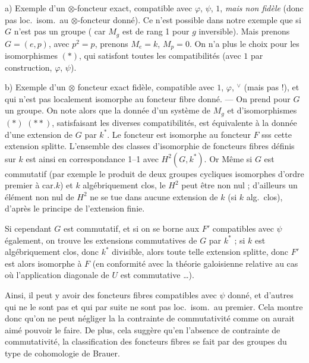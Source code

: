 \documentclass[11pt,a4paper]{article}
\begin{document}
a) Exemple d'un $\otimes$-foncteur exact, compatible avec $\varphi$, $\psi$,
$1$, \emph{mais non fidèle} (donc pas loc.\ isom.\ au $\otimes$-foncteur
donné). Ce n'est possible dans notre exemple que si $G$ n'est pas un groupe
( car $M_{g}$ est de rang 1 pour $g$ inversible). Mais prenons
$G = (e,p)$, avec $p^{2} = p$, prenons $M_{e} = k$, $M_{p} = 0$. On n'a plus le
choix pour les isomorphismes $(*)$, qui satisfont toutes les compatibilités
(avec $1$ par construction, $\varphi$, $\psi$).



b) Exemple d'un $\otimes$ foncteur exact fidèle, compatible avec
\struck{$\varphi$} $1$, $\varphi$, $^{\vee}$ (mais pas  !),
et qui n'est pas localement isomorphe au foncteur fibre donné. --- On prend pour
$G$ un groupe. On note alors que la donnée d'un système de $M_{g}$ et
d'isomorphismes $(*)$ \struck{\ill{}} $(**)$, satisfaisant les diverses
compatibilités, est équivalente à la donnée d'une extension de $G$ par $k^{*}$.
Le foncteur  est isomorphe au foncteur $F$ sss cette extension
splitte. L'ensemble des classes d'isomorphie de foncteurs fibres définis sur $k$
est ainsi en correspondance 1--1 avec $H^{2}(G,k^{*})$. Or Même si $G$ est
commutatif (par exemple le produit de deux groupes cycliques isomorphes d'ordre
premier à \struck{\ill{}} car.$k$) et $k$ algébriquement clos, le $H^{2}$ peut
être non nul ; \struck{\ill{}} d'ailleurs un élément non nul de $H^{2}$ ne se
tue dans aucune extension de $k$ (si $k$ alg.\ clos), d'après le principe de
l'extension finie.

Si cependant $G$ est commutatif, et si on se borne aux $F'$ compatibles avec
$\psi$ également, on trouve les extensions commutatives de $G$ par $k^{*}$ ; si
$k$ est algébriquement clos, donc $k^{*}$ divisible, alors toute telle extension
splitte, donc $F'$ est alors isomorphe à $F$ (en conformité avec la théorie
galoisienne relative au cas où l'application diagonale de $U$ est commutative
…).

Ainsi, il peut y avoir des foncteurs fibres compatibles avec $\psi$ donné, et
d'autres qui ne le sont pas et qui par suite ne sont pas loc.\ isom.\ au
premier. Cela montre donc qu'on ne peut négliger la  la
contrainte de commutativité comme on aurait aimé pouvoir le faire. De plus, cela
suggère qu'en l'absence de contrainte de commutativité, la classification des
foncteurs fibres se fait par des groupes du type de cohomologie de Brauer.
\end{document}
